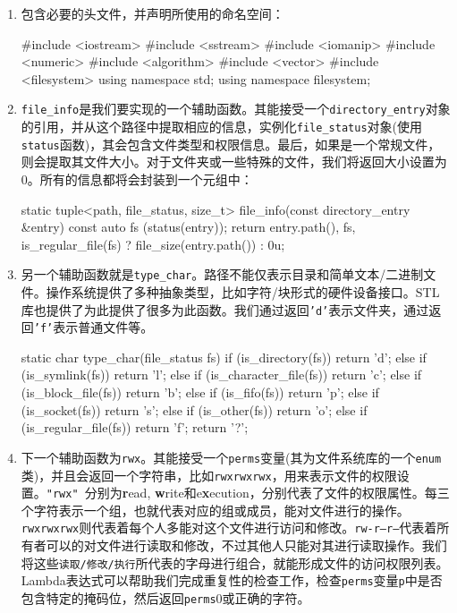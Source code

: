 \begin{enumerate}
\item 包含必要的头文件，并声明所使用的命名空间：

\begin{codebox}[cpp]
#include <iostream>
#include <sstream>
#include <iomanip>
#include <numeric>
#include <algorithm>
#include <vector>
#include <filesystem>
using namespace std;
using namespace filesystem;
\end{codebox}

\item \texttt{file\_info}是我们要实现的一个辅助函数。其能接受一个\texttt{directory\_entry}对象的引用，并从这个路径中提取相应的信息，实例化\texttt{file\_status}对象(使用\texttt{status}函数)，其会包含文件类型和权限信息。最后，如果是一个常规文件，则会提取其文件大小。对于文件夹或一些特殊的文件，我们将返回大小设置为0。所有的信息都将会封装到一个元组中：

\begin{codebox}[cpp]
static tuple<path, file_status, size_t>
file_info(const directory_entry &entry)
{
    const auto fs (status(entry));
    return {entry.path(),
            fs,
            is_regular_file(fs) ? file_size(entry.path()) : 0u};
}
\end{codebox}

\item 另一个辅助函数就是\texttt{type\_char}。路径不能仅表示目录和简单文本/二进制文件。操作系统提供了多种抽象类型，比如字符/块形式的硬件设备接口。STL库也提供了为此提供了很多为此函数。我们通过返回\texttt{'d'}表示文件夹，通过返回\texttt{'f'}表示普通文件等。

\begin{codebox}[cpp]
static char type_char(file_status fs)
{
    if (is_directory(fs)) { return 'd'; }
    else if (is_symlink(fs)) { return 'l'; }
    else if (is_character_file(fs)) { return 'c'; }
    else if (is_block_file(fs)) { return 'b'; }
    else if (is_fifo(fs)) { return 'p'; }
    else if (is_socket(fs)) { return 's'; }
    else if (is_other(fs)) { return 'o'; }
    else if (is_regular_file(fs)) { return 'f'; }
    return '?';
}
\end{codebox}

\item 下一个辅助函数为\texttt{rwx}。其能接受一个\texttt{perms}变量(其为文件系统库的一个\texttt{enum}类)，并且会返回一个字符串，比如\texttt{rwxrwxrwx}，用来表示文件的权限设置。\texttt{"rwx" }分别为\textbf{r}ead, \textbf{w}rite和e\textbf{x}ecution，分别代表了文件的权限属性。每三个字符表示一个组，也就代表对应的组或成员，能对文件进行的操作。\texttt{rwxrwxrwx}则代表着每个人多能对这个文件进行访问和修改。\texttt{rw-r--r--}代表着所有者可以的对文件进行读取和修改，不过其他人只能对其进行读取操作。我们将这些\texttt{读取/修改/执行}所代表的字母进行组合，就能形成文件的访问权限列表。Lambda表达式可以帮助我们完成重复性的检查工作，检查\texttt{perms}变量\texttt{p}中是否包含特定的掩码位，然后返回\texttt{perms}0或正确的字符。


\end{enumerate}
